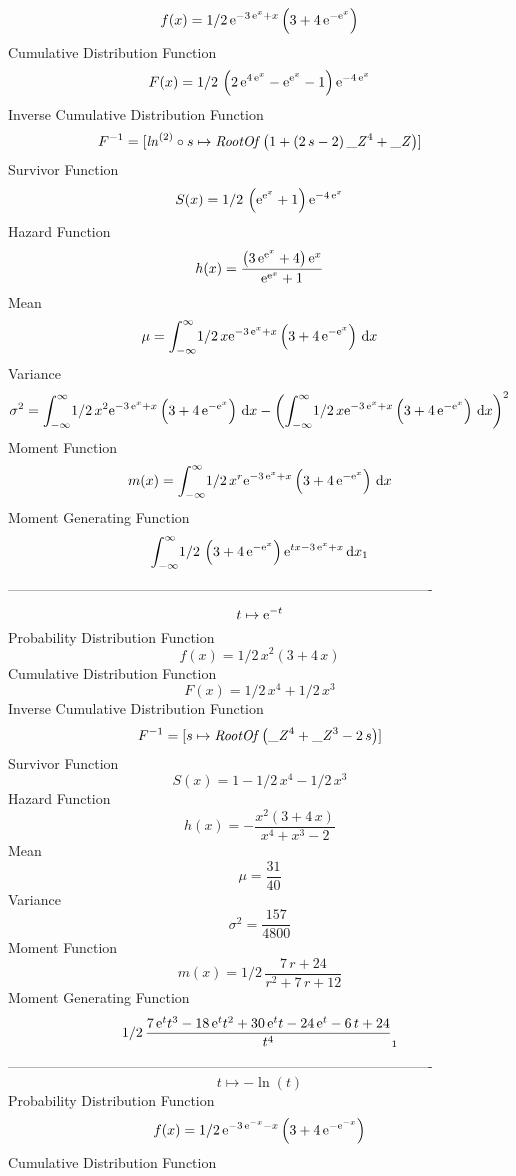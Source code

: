 \documentclass[12pt]{article}
\begin{document}
$$  f(x)=1/2\,{{\rm e}^{-3\,{{\rm e}^{x}}+x}} \left( 3+4\,{{\rm e}^{-{{\rm e}^{
x}}}} \right) 
$$Cumulative Distribution Function  
 $$F(x)=1/2\, \left( 2\,{{\rm e}^{4\,{{\rm e}^{x}}}}-{{\rm e}^{{{\rm e}^{x}}}}
-1 \right) {{\rm e}^{-4\,{{\rm e}^{x}}}}
$$ Inverse Cumulative Distribution Function 
  $$F^{-1} = [{\it ln}^{ \left( 2 \right) }\circ s\mapsto {\it RootOf} \left( 1+
 \left( 2\,s-2 \right) {{\it \_Z}}^{4}+{\it \_Z} \right) ]
$$Survivor Function 
 $$ S(x)=1/2\, \left( {{\rm e}^{{{\rm e}^{x}}}}+1 \right) {{\rm e}^{-4\,{
{\rm e}^{x}}}}
$$ Hazard Function 
 $$ h(x)={\frac { \left( 3\,{{\rm e}^{{{\rm e}^{x}}}}+4 \right) {{\rm e}^{x}}}{
{{\rm e}^{{{\rm e}^{x}}}}+1}}
$$Mean 
 $$ \mu=\int_{-\infty }^{\infty }\!1/2\,x{{\rm e}^{-3\,{{\rm e}^{x}}+x}}
 \left( 3+4\,{{\rm e}^{-{{\rm e}^{x}}}} \right) \,{\rm d}x
$$ Variance 
 $$ \sigma^2 = \int_{-\infty }^{\infty }\!1/2\,{x}^{2}{{\rm e}^{-3\,{{\rm e}^{x}}+x}}
 \left( 3+4\,{{\rm e}^{-{{\rm e}^{x}}}} \right) \,{\rm d}x- \left( 
\int_{-\infty }^{\infty }\!1/2\,x{{\rm e}^{-3\,{{\rm e}^{x}}+x}}
 \left( 3+4\,{{\rm e}^{-{{\rm e}^{x}}}} \right) \,{\rm d}x \right) ^{2
}
$$Moment Function 
 $$ m(x) = \int_{-\infty }^{\infty }\!1/2\,{x}^{r}{{\rm e}^{-3\,{{\rm e}^{x}}+x}}
 \left( 3+4\,{{\rm e}^{-{{\rm e}^{x}}}} \right) \,{\rm d}x
$$ Moment Generating Function 
 $$\int_{-\infty }^{\infty }\!1/2\, \left( 3+4\,{{\rm e}^{-{{\rm e}^{x}}}
} \right) {{\rm e}^{tx-3\,{{\rm e}^{x}}+x}}\,{\rm d}x_{{1}}
$$-------------------------------------------------------------------------------------------  \\$$t\mapsto {{\rm e}^{-t}}
$$Probability Distribution Function 
$$  f(x)=1/2\,{x}^{2} \left( 3+4\,x \right) 
$$Cumulative Distribution Function  
 $$F(x)=1/2\,{x}^{4}+1/2\,{x}^{3}
$$ Inverse Cumulative Distribution Function 
  $$F^{-1} = [s\mapsto {\it RootOf} \left( {{\it \_Z}}^{4}+{{\it \_Z}}^{3}-2\,s
 \right) ]
$$Survivor Function 
 $$ S(x)=1-1/2\,{x}^{4}-1/2\,{x}^{3}
$$ Hazard Function 
 $$ h(x)=-{\frac {{x}^{2} \left( 3+4\,x \right) }{{x}^{4}+{x}^{3}-2}}
$$Mean 
 $$ \mu={\frac{31}{40}}
$$ Variance 
 $$ \sigma^2 = {\frac{157}{4800}}
$$Moment Function 
 $$ m(x) = 1/2\,{\frac {7\,r+24}{{r}^{2}+7\,r+12}}
$$ Moment Generating Function 
 $$1/2\,{\frac {7\,{{\rm e}^{t}}{t}^{3}-18\,{{\rm e}^{t}}{t}^{2}+30\,{
{\rm e}^{t}}t-24\,{{\rm e}^{t}}-6\,t+24}{{t}^{4}}}_{{1}}
$$-------------------------------------------------------------------------------------------  \\$$t\mapsto -\ln  \left( t \right) 
$$Probability Distribution Function 
$$  f(x)=1/2\,{{\rm e}^{-3\,{{\rm e}^{-x}}-x}} \left( 3+4\,{{\rm e}^{-{{\rm e}^
{-x}}}} \right) 
$$Cumulative Distribution Function  
\end{document}
